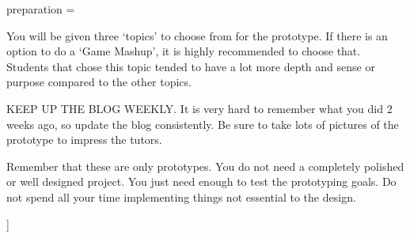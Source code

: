 preparation = {
    \item You will be given three `topics' to choose from for the prototype. If there is an option to do a `Game Mashup', it is highly recommended to choose that. Students that chose this topic tended to have a lot more depth and sense or purpose compared to the other topics.
    \item KEEP UP THE BLOG WEEKLY. It is very hard to remember what you did 2 weeks ago, so update the blog consistently. Be sure to take lots of pictures of the prototype to impress the tutors.
    \item Remember that these are only prototypes. You do not need a completely polished or well designed project. You just need enough to test the prototyping goals. Do not spend all your time implementing things not essential to the design.
}]{}
